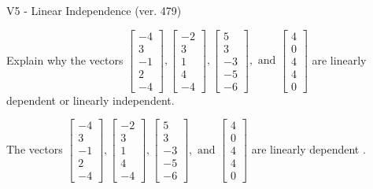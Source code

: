 \begin{exercise}
  \begin{exerciseTitle}V5 - Linear Independence (ver. 479)\end{exerciseTitle}
  \begin{exerciseStatement}
    Explain why the vectors \(\left[\begin{array}{r}
-4 \\
3 \\
-1 \\
2 \\
-4
\end{array}\right] , \left[\begin{array}{r}
-2 \\
3 \\
1 \\
4 \\
-4
\end{array}\right] , \left[\begin{array}{r}
5 \\
3 \\
-3 \\
-5 \\
-6
\end{array}\right] , \text{ and } \left[\begin{array}{r}
4 \\
0 \\
4 \\
4 \\
0
\end{array}\right]\) are linearly dependent or linearly independent.	


  \end{exerciseStatement}
  \begin{exerciseAnswer}
   The vectors \(\left[\begin{array}{r}
-4 \\
3 \\
-1 \\
2 \\
-4
\end{array}\right] , \left[\begin{array}{r}
-2 \\
3 \\
1 \\
4 \\
-4
\end{array}\right] , \left[\begin{array}{r}
5 \\
3 \\
-3 \\
-5 \\
-6
\end{array}\right] , \text{ and } \left[\begin{array}{r}
4 \\
0 \\
4 \\
4 \\
0
\end{array}\right]\) are 
  	 linearly dependent  .
  


  \end{exerciseAnswer}
\end{exercise}